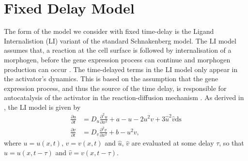 \chapter{Fixed Delay Model}

The form of the model we consider with fixed time-delay is the Ligand Internalistion (LI) variant of the standard Schnakenberg model. The LI model assumes that, a reaction at the cell surface is followed by internalisation of a morphogen, before the gene expression process can continue and morphogen production can occur \cite{leegaffney,yigaffneyli}. The time-delayed terms in the LI model only appear in the activator's dynamics. This is based on the assumption that the gene expression process, and thus the source of the time delay, is responsible for autocatalysis of the activator in the reaction-diffusion mechanism \cite{gaffmonk}. As derived in \cite{leegaffney}, the LI model is given by
\begin{equation}\label{fixed}
  \begin{split}
  \frac{\partial u}{\partial t}&=D_u\frac{\partial^2u}{\partial x^2}+a-u-2u^2v+3\hat{u}^2\hat{v} \text{ds}\\
  \frac{\partial v}{\partial t}&=D_v\frac{\partial^2v}{\partial x^2}+b-u^2v,
\end{split}
\end{equation}
where $u=u(x,t)$, $v=v(x,t)$ and $\hat{u}$, $\hat{v}$ are evaluated at some delay $\tau$, so that $\hat{u}=u(x,t-\tau)$ and $\hat{v}=v(x,t-\tau)$.
